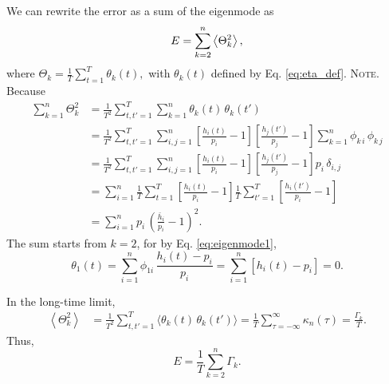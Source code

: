 \documentclass[reprint, floatfix]{revtex4-1}
\newcommand{\note}[1]{{\color{DarkGreen}\footnotesize \textsc{Note.} #1}}
\begin{document}
We can rewrite the error as
a sum of the eigenmode as
%
\begin{align}
  E
  =
  \sum_{ k = 2 }^n
    \left\langle
      \Theta_k^2
    \right\rangle
  ,
\notag
\end{align}
%
where
%
$
  \Theta_k
  =
  \frac{ 1 } { T }
  \sum_{ t = 1 } ^ T
    \theta_k( t )
  ,
$
%
with $\theta_k(t)$ defined by Eq. \eqref{eq:eta_def}.
%
\note{Because
%
\begin{align*}
\sum_{ k = 1 }^n
  \Theta_k^2
&=
\frac{ 1 } { T^2 }
\sum_{ t, t' = 1 }^T
  \sum_{ k = 1 }^n
    \theta_k( t ) \, \theta_k( t' )
\\
&=
\frac{ 1 } { T^2 }
\sum_{ t, t' = 1 }^T
  \sum_{ i, j = 1 }^n
    \left[
      \frac{ h_i(t) }
           { p_i    }
      - 1
    \right]
    \left[
      \frac{ h_j(t') }
           { p_j     }
      - 1
    \right]
    \sum_{ k = 1 }^n
      \phi_{k \, i} \, \phi_{k \, j}
\\
&=
\frac{ 1 } { T^2 }
\sum_{ t, t' = 1 }^T
  \sum_{ i, j = 1 }^n
    \left[
      \frac{ h_i(t) }
           { p_i    }
      - 1
    \right]
    \left[
      \frac{ h_j(t') }
           { p_j     }
      - 1
    \right]
    p_i \, \delta_{i, j}
\\
&=
\sum_{ i = 1 }^n
\frac{ 1 } { T }
\sum_{ t = 1 }^T
    \left[
      \frac{ h_i(t) }
           { p_i    }
      - 1
    \right]
\frac{ 1 } { T }
\sum_{ t' = 1 }^T
    \left[
      \frac{ h_i(t') }
           { p_i     }
      - 1
    \right]
\\
&=
\sum_{ i = 1 }^n
  p_i \,
    \left(
      \frac{ \bar h_i }
           { p_i      }
      - 1
    \right)^2
.
\end{align*}
}%
The sum starts from $k = 2$, for
by Eq. \eqref{eq:eigenmode1}, %
$$
\theta_1(t)
=
\sum_{ i = 1 }^n
  \phi_{1i} \, \frac{ h_i(t) - p_i } { p_i }
=
\sum_{ i = 1 }^n \left[ h_i(t) - p_i \right]
= 0.
$$

In the long-time limit,
\begin{align*}
  \left\langle
    \Theta_k^2
  \right\rangle
  &=
  \frac{1}{T^2}
  \sum_{ t, t' = 1 }^T
  \langle \theta_k(t) \, \theta_k(t') \rangle
  =
  \frac{1}{T}
  \sum_{\tau = -\infty}^\infty
    \kappa_n(\tau)
  =
  \frac{ \Gamma_k }{ T }
.
\end{align*}
%
Thus,
\begin{equation}
  E
  =
  \frac{ 1 } { T }
  \sum_{ k = 2 }^n \Gamma_k
  .
\label{eq:error_equil}
\end{equation}
\end{document}
